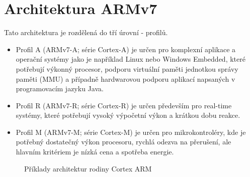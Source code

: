 \section{Architektura ARMv7}
  Tato architektura je rozdělená do tří úrovní - profilů.
  \begin{itemize}[noitemsep]
    \item Profil A (ARMv7-A; série Cortex-A) je určen pro komplexní aplikace a operační systémy  
          jako je například Linux nebo Windows Embedded, které potřebují výkonný procesor, podporu 
          virtuální paměti jednotkou správy paměti (MMU) a případně hardwarovou podporu aplikací 
          napsaných v programovacím jazyku Java.
    \item Profil R (ARMv7-R; série Cortex-R) je určen především pro real-time systémy, které 
          potřebují vysoký výpočetní výkon a krátkou dobu reakce.
    \item Profil M (ARMv7-M; série Cortex-M) je určen pro mikrokontroléry, kde je potřebný  
          dostatečný výkon procesoru, rychlá odezva na přerušení, ale hlavním kritériem je nízká 
          cena a spotřeba energie.
  \end{itemize}
  
  \begin{figure}[ht!]
    \centering
      {}              \newline
      {}              \newline
      {}
    \caption{Příklady architektur rodiny Cortex ARM}
  \end{figure}

